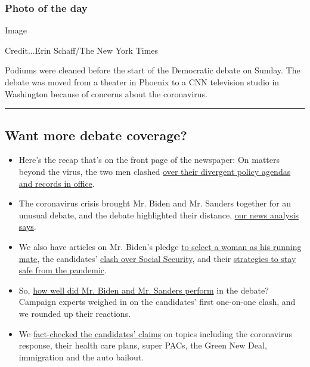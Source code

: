 \hypertarget{photo-of-the-day}{%
\subsubsection{Photo of the day}\label{photo-of-the-day}}

Image

Credit...Erin Schaff/The New York Times

Podiums were cleaned before the start of the Democratic debate on
Sunday. The debate was moved from a theater in Phoenix to a CNN
television studio in Washington because of concerns about the
coronavirus.

\begin{center}\rule{0.5\linewidth}{\linethickness}\end{center}

\hypertarget{want-more-debate-coverage}{%
\subsection{Want more debate
coverage?}\label{want-more-debate-coverage}}

\begin{itemize}
\item
  Here's the recap that's on the front page of the newspaper: On matters
  beyond the virus, the two men clashed
  \href{https://www.nytimes.com/2020/03/15/us/politics/biden-sanders-debate-recap.html}{over
  their divergent policy agendas and records in office}.
\item
  The coronavirus crisis brought Mr. Biden and Mr. Sanders together for
  an unusual debate, and the debate highlighted their distance,
  \href{https://www.nytimes.com/2020/03/15/us/politics/biden-sanders-cnn-debate.html}{our
  news analysis says}.
\item
  We also have articles on Mr. Biden's pledge
  \href{https://www.nytimes.com/2020/03/15/us/politics/joe-biden-female-vice-president.html}{to
  select a woman as his running mate}, the candidates'
  \href{https://www.nytimes.com/2020/03/15/us/politics/joe-biden-social-security.html}{clash
  over Social Security}, and their
  \href{https://www.nytimes.com/2020/03/15/us/politics/joe-biden-bernie-sanders-coronavirus.html}{strategies
  to stay safe from the pandemic}.
\item
  So,
  \href{https://www.nytimes.com/2020/03/15/us/politics/who-won-democratic-debate.html}{how
  well did Mr. Biden and Mr. Sanders perform} in the debate? Campaign
  experts weighed in on the candidates' first one-on-one clash, and we
  rounded up their reactions.
\item
  We
  \href{https://www.nytimes.com/2020/03/15/us/politics/democratic-debate-fact-check.html}{fact-checked
  the candidates' claims} on topics including the coronavirus response,
  their health care plans, super PACs, the Green New Deal, immigration
  and the auto bailout.
\end{itemize}

